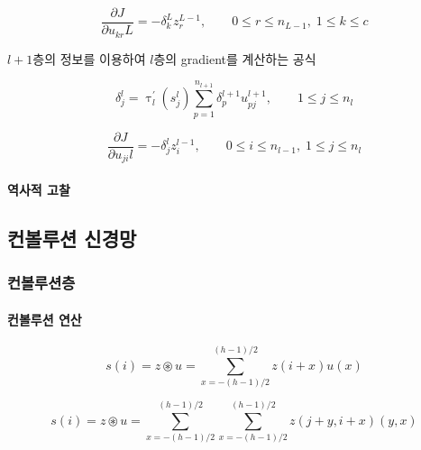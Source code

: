 \documentclass [12pt] {oblivoir}
\let\oldsubsubsection=\subsubsection
\renewcommand{\subsubsection}
{
  \filbreak
  \oldsubsubsection
}
\begin{document}
\begin{equation} \tag{4.7}
  \frac{\partial J}{\partial u_{kr}{L}} = -\delta_{k}^{L}z_{r}^{L-1}, \qquad 0 \le r \le n_{L-1}, \; 1\le k \le c
\end{equation}

$l + 1$층의 정보를 이용하여 $l$층의 gradient를 계산하는 공식

\begin{equation} \tag{4.8}
  \delta_{j}^{l} = \uptau_{l}^{'}(s_{j}^{l})\sum_{p=1}^{n_{l+1}}\delta_{p}^{l+1}u_{pj}^{l+1}, \qquad 1 \le j \le n_{l}
\end{equation}

\begin{equation} \tag{4.9}
  \frac{\partial J}{\partial u_{ji}{l}} = -\delta_{j}^{l}z_{i}^{l-1}, \qquad 0 \le i \le n_{l-1}, \; 1\le j \le n_{l}
\end{equation}
\vspace{3mm}

\paragraph*{역사적 고찰}\mbox{}

\vspace{3mm}

\subsection{컨볼루션 신경망}

\subsubsection{컨볼루션층}

\paragraph*{컨볼루션 연산}\mbox{}

\begin{equation} \tag{4.10}
  s(i) = z \circledast u = \sum_{x=-(h - 1) / 2}^{(h - 1) / 2}z(i + x)u(x)
\end{equation}

\begin{equation} \tag{4.11}
  s(i) = z \circledast u = \sum_{x=-(h - 1) / 2}^{(h - 1) / 2}\sum_{x = -(h - 1) / 2}^{(h - 1) / 2}z(j + y, i + x)(y, x)
\end{equation}

\vspace{3mm}
\end{document}

